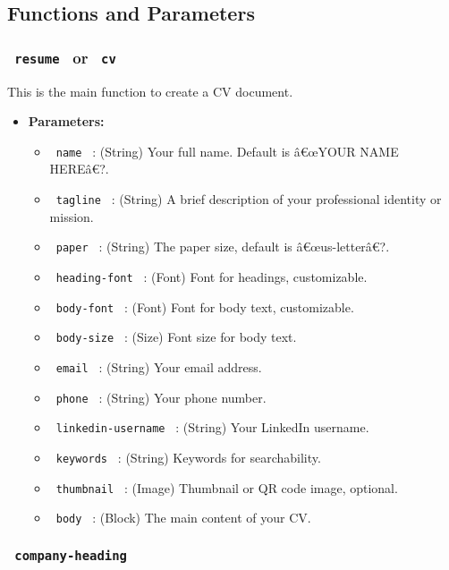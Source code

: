 \subsection{Functions and Parameters}\label{functions-and-parameters}

\subsubsection{\texorpdfstring{\texttt{\ resume\ } or
\texttt{\ cv\ }}{ resume  or  cv }}\label{resume-or-cv}

This is the main function to create a CV document.

\begin{itemize}
\tightlist
\item
  \textbf{Parameters:}

  \begin{itemize}
  \tightlist
  \item
    \texttt{\ name\ } : (String) Your full name. Default is â€œYOUR NAME
    HEREâ€?.
  \item
    \texttt{\ tagline\ } : (String) A brief description of your
    professional identity or mission.
  \item
    \texttt{\ paper\ } : (String) The paper size, default is
    â€œus-letterâ€?.
  \item
    \texttt{\ heading-font\ } : (Font) Font for headings, customizable.
  \item
    \texttt{\ body-font\ } : (Font) Font for body text, customizable.
  \item
    \texttt{\ body-size\ } : (Size) Font size for body text.
  \item
    \texttt{\ email\ } : (String) Your email address.
  \item
    \texttt{\ phone\ } : (String) Your phone number.
  \item
    \texttt{\ linkedin-username\ } : (String) Your LinkedIn username.
  \item
    \texttt{\ keywords\ } : (String) Keywords for searchability.
  \item
    \texttt{\ thumbnail\ } : (Image) Thumbnail or QR code image,
    optional.
  \item
    \texttt{\ body\ } : (Block) The main content of your CV.
  \end{itemize}
\end{itemize}

\subsubsection{\texorpdfstring{\texttt{\ company-heading\ }}{ company-heading }}\label{company-heading}

